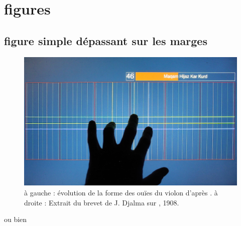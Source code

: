 \section*{figures}

\subsection*{figure simple dépassant sur les marges}

\begin{figure}[!htbp]
	\centerline{
		\includegraphics[width=1.2\textwidth]{gfx/06_visual_representation/mpTUI_pitchgrid_72dpi.png}
	}
	\caption{à gauche : évolution de la forme des ouïes du violon d'après \cite{nia_evolution_2015}. à droite : Extrait du brevet de J. Djalma sur , 1908.}
	\label{fig:sandbox:single}
\end{figure}

ou bien

\begin{center}
\end{center}

